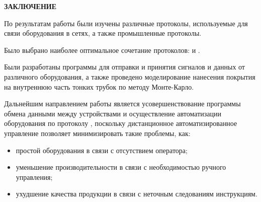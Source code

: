 \documentclass[../AISTR.tex]{subfiles}
\begin{document}
\begin{center}
\normalsize\bfseries\MakeUppercase{заключение}
\end{center}

По результатам работы были изучены различные протоколы, используемые для связи оборудования в сетях, а также промышленные протоколы.

Было выбрано наиболее оптимальное сочетание протоколов: \mb и \tcp.

Были разработаны программы для отправки и принятия сигналов и данных от различного оборудования, а также проведено моделирование нанесения покрытия на внутреннюю часть тонких трубок по методу Монте-Карло.
	
Дальнейшим направлением работы является усовершенствование программы обмена данными между устройствами и осуществление автоматизации оборудования по протоколу \mb \tcp, поскольку дистанционное автоматизированное управление позволяет минимизировать такие проблемы, как:
\begin{itemize}
	\item простой оборудования в связи с отсутствием оператора;
	\item уменьшение производительности в связи с необходимостью ручного управления;
	\item ухудшение качества продукции в связи с неточным следованиям инструкциям.
\end{itemize}
\end{document}
